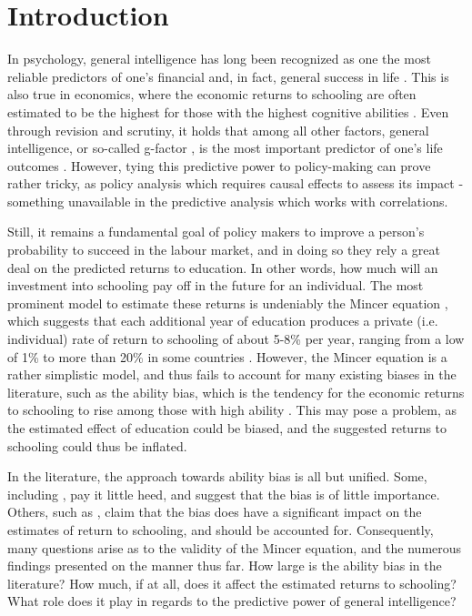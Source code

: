 \chapter{Introduction}
\label{chap:one}

In psychology, general intelligence has long been recognized as one the most reliable predictors of one's financial and, in fact, general success in life \citep{deary2007intelligence,gottfredson1997g}. This is also true in economics, where the economic returns to schooling are often estimated to be the highest for those with the highest cognitive abilities \citep{herrnstein2010bell}. Even through revision and scrutiny, it holds that among all other factors, general intelligence, or so-called g-factor \citep{olea1994predicting}, is the most important predictor of one's life outcomes \citep{ganzach2018wages}. However, tying this predictive power to policy-making can prove rather tricky, as policy analysis which requires causal effects to assess its impact - something unavailable in the predictive analysis which works with correlations.

Still, it remains a fundamental goal of policy makers to improve a person's probability to succeed in the labour market, and in doing so they rely a great deal on the predicted returns to education. In other words, how much will an investment into schooling pay off in the future for an individual. The most prominent model to estimate these returns is undeniably the Mincer equation \citep{mincer1974schooling}, which suggests that each additional year of education produces a private (i.e. individual) rate of return to schooling of about 5-8\% per year, ranging from a low of 1\% to more than 20\% in some countries \citep{psacharopoulos2018meta}. However, the Mincer equation is a rather simplistic model, and thus fails to account for many existing biases in the literature, such as the ability bias, which is the tendency for the economic returns to schooling to rise among those with high ability \citep{griliches1977estimating,heckman2001identifying}. This may pose a problem, as the estimated effect of education could be biased, and the suggested returns to schooling could thus be inflated.

In the literature, the approach towards ability bias is all but unified. Some, including \cite{ashenfelter1999schooling}, pay it little heed, and suggest that the bias is of little importance. Others, such as \cite{wincenciak2022meta}, claim that the bias does have a significant impact on the estimates of return to schooling, and should be accounted for. Consequently, many questions arise as to the validity of the Mincer equation, and the numerous findings presented on the manner thus far. How large is the ability bias in the literature? How much, if at all, does it affect the estimated returns to schooling? What role does it play in regards to the predictive power of general intelligence?


